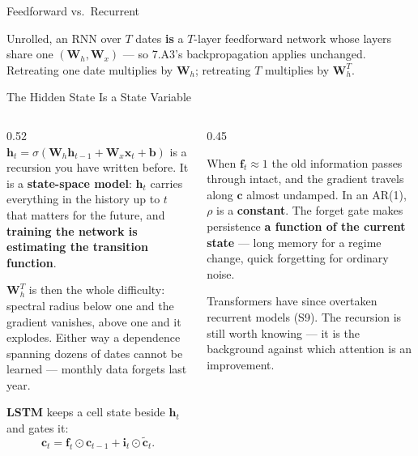 \begin{frame}{Feedforward vs.\ Recurrent}
\begin{takeawaybox}\footnotesize
Unrolled, an RNN over $T$ dates \textbf{is} a $T$-layer feedforward network whose layers share one $(\mathbf{W}_h,\mathbf{W}_x)$ --- so 7.A3's backpropagation applies unchanged. Retreating one date multiplies by $\mathbf{W}_h$; retreating $T$ multiplies by $\mathbf{W}_h^{T}$.
\end{takeawaybox}
\vspace{1mm}
\end{frame}

\begin{frame}{The Hidden State Is a State Variable}
\begin{columns}[T]
\begin{column}{0.52\textwidth}
\small
$\mathbf{h}_t=\sigma(\mathbf{W}_h\mathbf{h}_{t-1}+\mathbf{W}_x\mathbf{x}_t+\mathbf{b})$ is a recursion you have written before. It is a \textbf{state-space model}: $\mathbf{h}_t$ carries everything in the history up to $t$ that matters for the future, and \textbf{training the network is estimating the transition function}.
\medskip

$\mathbf{W}_h^{T}$ is then the whole difficulty: spectral radius below one and the gradient vanishes, above one and it explodes. Either way a dependence spanning dozens of dates cannot be learned --- monthly data forgets last year.
\medskip

\textbf{LSTM} keeps a cell state beside $\mathbf{h}_t$ and gates it:
\[
  \mathbf{c}_t=\mathbf{f}_t\odot\mathbf{c}_{t-1}+\mathbf{i}_t\odot\tilde{\mathbf{c}}_t .
\]
\end{column}
\begin{column}{0.45\textwidth}
\begin{conceptbox}[title=\textbf{The forget gate, read as an economist}]\small
When $\mathbf{f}_t\approx1$ the old information passes through intact, and the gradient travels along $\mathbf{c}$ almost undamped.
\smallskip
In an AR(1), $\rho$ is a \textbf{constant}. The forget gate makes persistence \textbf{a function of the current state} --- long memory for a regime change, quick forgetting for ordinary noise.
\end{conceptbox}
\smallskip
\begin{cautionbox}\footnotesize
Transformers have since overtaken recurrent models (S9). The recursion is still worth knowing --- it is the background against which attention is an improvement.
\end{cautionbox}
\end{column}
\end{columns}
\vspace{1mm}
\end{frame}

